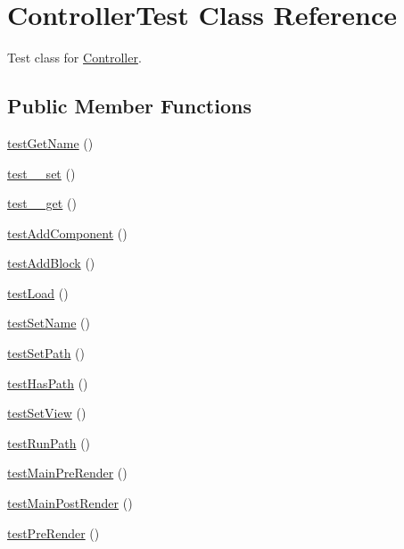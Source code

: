 \hypertarget{class_controller_test}{
\section{ControllerTest Class Reference}
\label{class_controller_test}
}


Test class for \hyperlink{class_controller}{Controller}.  


\subsection*{Public Member Functions}
\begin{DoxyCompactItemize}
\item 
\hyperlink{class_controller_test_acba9d09ebb47d7bcc46128a07f694ccd}{testGetName} ()
\item 
\hyperlink{class_controller_test_a7b300f4c5f11473da6817fc40dddfb65}{test\_\-\_\-set} ()
\item 
\hyperlink{class_controller_test_a0bd71464eaa6e9559e3f4d78d70f224f}{test\_\-\_\-get} ()
\item 
\hyperlink{class_controller_test_a50544a9c31e0a302438a1d93152d16df}{testAddComponent} ()
\item 
\hyperlink{class_controller_test_a199ef516140a2c7749869a86941ffd4d}{testAddBlock} ()
\item 
\hyperlink{class_controller_test_a9772b11dffd28551c31884820d2ca5a0}{testLoad} ()
\item 
\hyperlink{class_controller_test_aa266c56714debf7411043e50816febfb}{testSetName} ()
\item 
\hyperlink{class_controller_test_aee9eb7cc15a6702779af7c6dcd6f37f7}{testSetPath} ()
\item 
\hyperlink{class_controller_test_ad342a101d96328075917c8ded4d109a4}{testHasPath} ()
\item 
\hyperlink{class_controller_test_acc332363200dfd6b2f0cd9df5a567788}{testSetView} ()
\item 
\hyperlink{class_controller_test_af74af347aef8c236c3f30793e881a56c}{testRunPath} ()
\item 
\hyperlink{class_controller_test_adebbb5338f993c808bf7d67d691cf1a9}{testMainPreRender} ()
\item 
\hyperlink{class_controller_test_a92fe7f1df3870f770d2a4d8e65994755}{testMainPostRender} ()
\item 
\hyperlink{class_controller_test_ac6794ab53872a13d8d18dcac6d64c46e}{testPreRender} ()
\item 

\end{DoxyCompactItemize}
